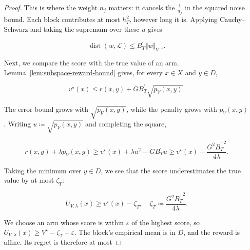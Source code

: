 {{\begin{proof}
This is where the weight $n_{j}$ matters: it cancels the $\frac{1}{n_{j}}$ in the
squared noise bound. Each block contributes at most $h_{T}^{2}$, however
long it is. Applying Cauchy--Schwarz and taking the supremum over these
$u$ gives



\begin{equation}
\operatorname{dist} \left( w , \mathcal{L} \right) \le B_{T}^{\prime} {\left\Vert w \right\Vert}_{V^{- 1}} .\label{eq:soft-subspace-certificate}
\end{equation}



Next, we compare the score with the true value of an arm.
Lemma~\ref{lem:subspace-reward-bound} gives, for every $x \in X$ and $y \in D$,


\begin{equation}
v^{\star} \left( x \right) \le r \left( x , y \right) + G B_{T}^{\prime} \sqrt{p_{V} \left( x , y \right)} .\label{eq:soft-reward-certificate}
\end{equation}


The error bound grows with $\sqrt{p_{V} \left( x , y \right)}$, while the penalty grows with
$p_{V} \left( x , y \right)$. Writing $u \coloneqq \sqrt{p_{V} \left( x , y \right)}$ and completing the square,


\begin{equation*}
r \left( x , y \right) + \lambda p_{V} \left( x , y \right) \ge v^{\star} \left( x \right) + \lambda u^{2} - G B_{T}^{\prime} u \ge v^{\star} \left( x \right) - \frac{G^{2} {B_{T}^{\prime}}^{2}}{4 \lambda} .
\end{equation*}


Taking the minimum over $y \in D$, we see that the score underestimates
the true value by at most $\zeta_{T}$:



\begin{equation}
U_{V , \lambda} \left( x \right) \ge v^{\star} \left( x \right) - \zeta_{T} , \quad \zeta_{T} \coloneqq \frac{G^{2} {B_{T}^{\prime}}^{2}}{4 \lambda} .\label{eq:soft-optimism}
\end{equation}



We choose an arm whose score is within $\varepsilon$ of the highest score,
so $U_{V , \lambda} \left( x \right) \ge V^{\star} - \zeta_{T} - \varepsilon$. The block's empirical mean is in
$D$, and the reward is affine. Its regret is therefore at most



\end{proof}}}
